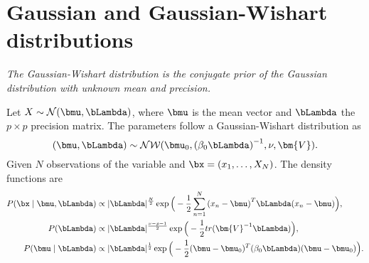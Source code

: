 \section{Gaussian and Gaussian-Wishart distributions}

\emph{The Gaussian-Wishart distribution is the conjugate prior of the Gaussian distribution with unknown mean and precision.}


Let \(X \sim \mathcal{N}(\bmu, \bLambda)\), where \(\bmu\) is the mean vector and \(\bLambda\) the \(p \times p\)  precision matrix. The parameters follow a Gaussian-Wishart distribution as
\[
  (\bmu, \bLambda) \sim \mathcal{N}\mathcal{W}(\bmu_{0}, {(\beta_{0}\bLambda)}^{-1}, \nu, \bm{V}).
\]
Given \(N\) observations of the variable and \(\bx =(x_{1},\dots, X_{N})\). The density functions are
\[
  \begin{aligned}
    P(\bx \mid \bmu, \bLambda) &\propto |\bLambda|^{\frac{N}{2}}\exp \Big( -\frac{1}{2}\sum_{n=1}^{N}{(x_{n} - \bmu)}^{T}\bLambda(x_{n} - \bmu) \Big),\\
    P(\bLambda) &\propto |\bLambda|^{\frac{\nu-p-1}{2}}\exp \Big(-\frac{1}{2}tr(\bm{V}^{-1}\bLambda)\Big),\\
    P(\bmu \mid \bLambda) &\propto |\bLambda|^{\frac{1}{2}} \exp \Big( -\frac{1}{2}(\bmu - \bmu_{0})^{T}(\beta_{0}\bLambda)(\bmu-\bmu_{0}) \Big).
  \end{aligned}
\]

